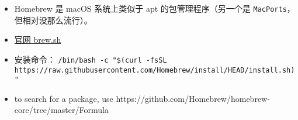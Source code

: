 
\begin{issues}
\issueDraft
\end{issues}

\begin{itemize}
\item Homebrew 是 macOS 系统上类似于 apt 的包管理程序（另一个是 \verb|MacPorts|，但相对没那么流行）。
\item \href{https://brew.sh}{官网 brew.sh}
\item 安装命令： \verb|/bin/bash -c "$(curl -fsSL https://raw.githubusercontent.com/Homebrew/install/HEAD/install.sh)"|
\item to search for a package, use https://github.com/Homebrew/homebrew-core/tree/master/Formula
\end{itemize}
